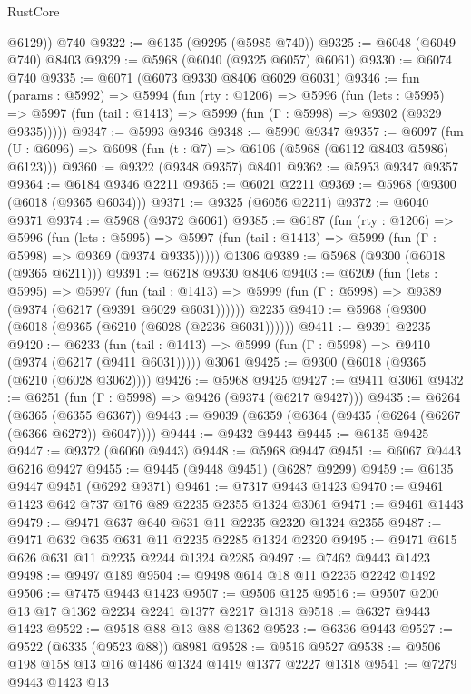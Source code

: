 \begin{lexlean}{RustCore}
\begin{coremodule}
        @6129))
    @740
@9322 := @6135 (@9295 (@5985 @740))
@9325 := @6048 (@6049 @740) @8403
@9329 := @5968 (@6040 (@9325 @6057) @6061)
@9330 := @6074 @740
@9335 := @6071 (@6073 @9330 @8406 @6029 @6031)
@9346 := fun (params : @5992) =>
  @5994
    (fun (rty : @1206) =>
    @5996
      (fun (lets : @5995) =>
      @5997 (fun (tail : @1413) => @5999 (fun (Γ : @5998) => @9302 (@9329 @9335)))))
@9347 := @5993 @9346
@9348 := @5990 @9347
@9357 := @6097 (fun (U : @6096) => @6098 (fun (t : @7) => @6106 (@5968 (@6112 @8403 @5986) @6123)))
@9360 := @9322 (@9348 @9357) @8401
@9362 := @5953 @9347 @9357
@9364 := @6184 @9346 @2211
@9365 := @6021 @2211
@9369 := @5968 (@9300 (@6018 (@9365 @6034)))
@9371 := @9325 (@6056 @2211)
@9372 := @6040 @9371
@9374 := @5968 (@9372 @6061)
@9385 := @6187
    (fun (rty : @1206) =>
    @5996
      (fun (lets : @5995) =>
      @5997 (fun (tail : @1413) => @5999 (fun (Γ : @5998) => @9369 (@9374 @9335)))))
    @1306
@9389 := @5968 (@9300 (@6018 (@9365 @6211)))
@9391 := @6218 @9330 @8406
@9403 := @6209
    (fun (lets : @5995) =>
    @5997
      (fun (tail : @1413) => @5999 (fun (Γ : @5998) => @9389 (@9374 (@6217 (@9391 @6029 @6031))))))
    @2235
@9410 := @5968 (@9300 (@6018 (@9365 (@6210 (@6028 (@2236 @6031))))))
@9411 := @9391 @2235
@9420 := @6233
    (fun (tail : @1413) => @5999 (fun (Γ : @5998) => @9410 (@9374 (@6217 (@9411 @6031)))))
    @3061
@9425 := @9300 (@6018 (@9365 (@6210 (@6028 @3062))))
@9426 := @5968 @9425
@9427 := @9411 @3061
@9432 := @6251 (fun (Γ : @5998) => @9426 (@9374 (@6217 @9427)))
@9435 := @6264 (@6365 (@6355 @6367))
@9443 := @9039 (@6359 (@6364 (@9435 (@6264 (@6267 (@6366 @6272)) @6047))))
@9444 := @9432 @9443
@9445 := @6135 @9425
@9447 := @9372 (@6060 @9443)
@9448 := @5968 @9447
@9451 := @6067 @9443 @6216 @9427
@9455 := @9445 (@9448 @9451) (@6287 @9299)
@9459 := @6135 @9447 @9451 (@6292 @9371)
@9461 := @7317 @9443 @1423
@9470 := @9461 @1423 @642 @737 @176 @89 @2235 @2355 @1324 @3061
@9471 := @9461 @1443
@9479 := @9471 @637 @640 @631 @11 @2235 @2320 @1324 @2355
@9487 := @9471 @632 @635 @631 @11 @2235 @2285 @1324 @2320
@9495 := @9471 @615 @626 @631 @11 @2235 @2244 @1324 @2285
@9497 := @7462 @9443 @1423
@9498 := @9497 @189
@9504 := @9498 @614 @18 @11 @2235 @2242 @1492
@9506 := @7475 @9443 @1423
@9507 := @9506 @125
@9516 := @9507 @200 @13 @17 @1362 @2234 @2241 @1377 @2217 @1318
@9518 := @6327 @9443 @1423
@9522 := @9518 @88 @13 @88 @1362
@9523 := @6336 @9443
@9527 := @9522 (@6335 (@9523 @88)) @8981
@9528 := @9516 @9527
@9538 := @9506 @198 @158 @13 @16 @1486 @1324 @1419 @1377 @2227 @1318
@9541 := @7279 @9443 @1423 @13

\end{coremodule}
\end{lexlean}

